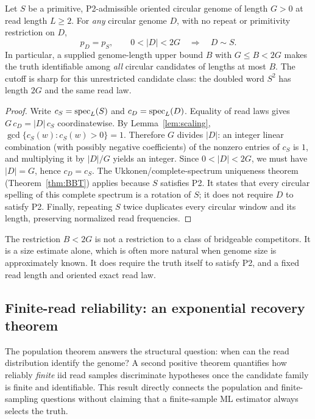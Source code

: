 \begin{theorem}
\label{thm:one-sided-length-window}
Let $S$ be a primitive, P2-admissible oriented circular genome
of length $G>0$ at read length $L\ge2$. For \emph{any} circular
genome $D$, with no repeat or primitivity restriction on $D$,
\[
  p_D=p_S,\qquad 0<|D|<2G
  \quad\Longrightarrow\quad D\sim S .
\]
In particular, a supplied genome-length upper bound $B$ with
$G\le B<2G$ makes the truth identifiable among \emph{all}
circular candidates of lengths at most $B$.
The cutoff is sharp for this unrestricted candidate class:
the doubled word $S^2$ has length $2G$ and the same read law.
\end{theorem}
\begin{proof}
Write $c_S=\operatorname{spec}_L(S)$ and $c_D=\operatorname{spec}_L(D)$. Equality of
read laws gives $G\,c_D=|D|\,c_S$ coordinatewise. By
Lemma~\ref{lem:scaling}, $\gcd\{c_S(w):c_S(w)>0\}=1$.
Therefore $G$ divides $|D|$: an integer linear combination (with possibly negative coefficients)
of the nonzero entries of $c_S$ is $1$, and multiplying it
by $|D|/G$ yields an integer. Since $0<|D|<2G$,
we must have $|D|=G$, hence $c_D=c_S$.
The Ukkonen/complete-spectrum uniqueness theorem
(Theorem~\ref{thm:BBT}) applies because \emph{$S$} satisfies
P2. It states that every circular spelling of this complete
spectrum is a rotation of $S$; it does not require $D$ to
satisfy P2. Finally, repeating $S$ twice duplicates every
circular window and its length, preserving normalized
read frequencies.
\end{proof}

The restriction $B<2G$ is not a restriction to
a class of bridgeable competitors. It is a size estimate
alone, which is often more natural when genome size is
approximately known. It does require the truth itself to
satisfy P2, and a fixed read length and oriented exact read law.

\subsection{Finite-read reliability: an exponential recovery theorem}
\label{sec:finite-recovery}

The population theorem answers the structural question: when can the read
distribution identify the genome?  A second positive theorem quantifies how
reliably \emph{finite} iid read samples discriminate hypotheses once the
candidate family is finite and identifiable.  This result directly connects
the population and finite-sampling questions without claiming that a
finite-sample ML estimator always selects the truth.

